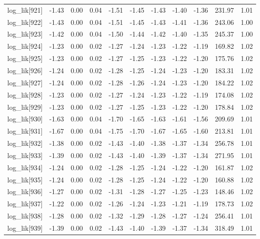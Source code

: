 \begin{table}[ht]
\begin{tabular}{rrrrrrrrrrr}
  log\_lik[921] & -1.43 & 0.00 & 0.04 & -1.51 & -1.45 & -1.43 & -1.40 & -1.36 & 231.97 & 1.01 \\ 
  log\_lik[922] & -1.43 & 0.00 & 0.04 & -1.51 & -1.45 & -1.43 & -1.41 & -1.36 & 243.06 & 1.00 \\ 
  log\_lik[923] & -1.42 & 0.00 & 0.04 & -1.50 & -1.44 & -1.42 & -1.40 & -1.35 & 245.37 & 1.00 \\ 
  log\_lik[924] & -1.23 & 0.00 & 0.02 & -1.27 & -1.24 & -1.23 & -1.22 & -1.19 & 169.82 & 1.02 \\ 
  log\_lik[925] & -1.23 & 0.00 & 0.02 & -1.27 & -1.25 & -1.23 & -1.22 & -1.20 & 175.76 & 1.02 \\ 
  log\_lik[926] & -1.24 & 0.00 & 0.02 & -1.28 & -1.25 & -1.24 & -1.23 & -1.20 & 183.31 & 1.02 \\ 
  log\_lik[927] & -1.24 & 0.00 & 0.02 & -1.28 & -1.26 & -1.24 & -1.23 & -1.20 & 184.22 & 1.02 \\ 
  log\_lik[928] & -1.23 & 0.00 & 0.02 & -1.27 & -1.24 & -1.23 & -1.22 & -1.19 & 174.08 & 1.02 \\ 
  log\_lik[929] & -1.23 & 0.00 & 0.02 & -1.27 & -1.25 & -1.23 & -1.22 & -1.20 & 178.84 & 1.02 \\ 
  log\_lik[930] & -1.63 & 0.00 & 0.04 & -1.70 & -1.65 & -1.63 & -1.61 & -1.56 & 209.69 & 1.01 \\ 
  log\_lik[931] & -1.67 & 0.00 & 0.04 & -1.75 & -1.70 & -1.67 & -1.65 & -1.60 & 213.81 & 1.01 \\ 
  log\_lik[932] & -1.38 & 0.00 & 0.02 & -1.43 & -1.40 & -1.38 & -1.37 & -1.34 & 256.78 & 1.01 \\ 
  log\_lik[933] & -1.39 & 0.00 & 0.02 & -1.43 & -1.40 & -1.39 & -1.37 & -1.34 & 271.95 & 1.01 \\ 
  log\_lik[934] & -1.24 & 0.00 & 0.02 & -1.28 & -1.25 & -1.24 & -1.22 & -1.20 & 161.87 & 1.02 \\ 
  log\_lik[935] & -1.24 & 0.00 & 0.02 & -1.28 & -1.25 & -1.24 & -1.22 & -1.20 & 160.88 & 1.02 \\ 
  log\_lik[936] & -1.27 & 0.00 & 0.02 & -1.31 & -1.28 & -1.27 & -1.25 & -1.23 & 148.46 & 1.02 \\ 
  log\_lik[937] & -1.22 & 0.00 & 0.02 & -1.26 & -1.24 & -1.23 & -1.21 & -1.19 & 178.73 & 1.02 \\ 
  log\_lik[938] & -1.28 & 0.00 & 0.02 & -1.32 & -1.29 & -1.28 & -1.27 & -1.24 & 256.41 & 1.01 \\ 
  log\_lik[939] & -1.39 & 0.00 & 0.02 & -1.43 & -1.40 & -1.39 & -1.37 & -1.34 & 318.49 & 1.01 \\ 

\end{tabular}
\end{table}
